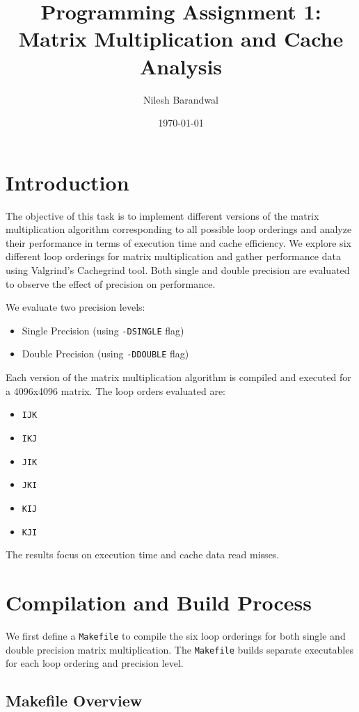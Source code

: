 \documentclass[12pt]{article}
\title{Programming Assignment 1: Matrix Multiplication and Cache Analysis}
\author{Nilesh Barandwal}
\date{\today}
\begin{document}
\maketitle

\section{Introduction}

The objective of this task is to implement different versions of the matrix multiplication algorithm corresponding to all possible loop orderings and analyze their performance in terms of execution time and cache efficiency. We explore six different loop orderings for matrix multiplication and gather performance data using Valgrind's Cachegrind tool. Both single and double precision are evaluated to observe the effect of precision on performance.

We evaluate two precision levels:
\begin{itemize}
    \item Single Precision (using \texttt{-DSINGLE} flag)
    \item Double Precision (using \texttt{-DDOUBLE} flag)
\end{itemize}

Each version of the matrix multiplication algorithm is compiled and executed for a 4096x4096 matrix. The loop orders evaluated are:
\begin{itemize}
    \item \texttt{IJK}
    \item \texttt{IKJ}
    \item \texttt{JIK}
    \item \texttt{JKI}
    \item \texttt{KIJ}
    \item \texttt{KJI}
\end{itemize}

The results focus on execution time and cache data read misses.

\section{Compilation and Build Process}

We first define a \texttt{Makefile} to compile the six loop orderings for both single and double precision matrix multiplication. The \texttt{Makefile} builds separate executables for each loop ordering and precision level.

\subsection{Makefile Overview}
\end{document}
